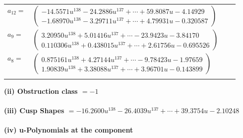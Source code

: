 \documentclass[1p]{elsarticle_modified}
\theoremstyle{definition}
\begin{document}
\begin{tabular}{m{7pt} m{180pt} m{7pt} m{180pt} }
\flushright $a_{12}=$&$\begin{pmatrix}-14.5571 u^{138}-24.2886 u^{137}+\cdots+59.8087 u-4.14929\\-1.68970 u^{138}-3.29711 u^{137}+\cdots+4.79931 u-0.320587\end{pmatrix}$ \\
\flushright $a_{9}=$&$\begin{pmatrix}3.20950 u^{138}+5.01416 u^{137}+\cdots-23.9423 u-3.84170\\0.110306 u^{138}+0.438015 u^{137}+\cdots+2.61756 u-0.695526\end{pmatrix}$ \\
\flushright $a_{8}=$&$\begin{pmatrix}0.875161 u^{138}+4.27144 u^{137}+\cdots-9.78423 u-1.97659\\1.90839 u^{138}+3.38088 u^{137}+\cdots+3.96701 u-0.143899\end{pmatrix}$\\&\end{tabular}
\flushleft \textbf{(ii) Obstruction class $= -1$}\\~\\
\flushleft \textbf{(iii) Cusp Shapes $= -16.2600 u^{138}-26.4039 u^{137}+\cdots+39.3754 u-2.10248$}\\~\\
\newpage\renewcommand{\arraystretch}{1}
\flushleft \textbf{(iv) u-Polynomials at the component}\newline \\
\end{document}
